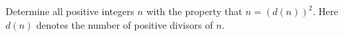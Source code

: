 Determine all positive integers $n$ with the property that  $n = (d(n))^2$. Here $d(n)$ denotes the number of positive divisors of $n$.